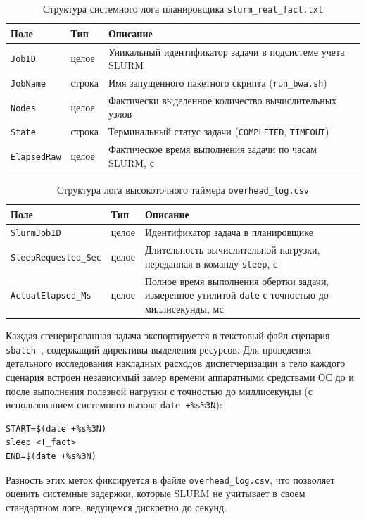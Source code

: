 \begin{table}[H]
\caption{Структура системного лога планировщика \texttt{slurm\_real\_fact.txt}}
\label{tab:csv_fact}
\centering
\small
\begin{tabular}{|l|l|p{8.5cm}|}
\hline
Поле & Тип & Описание \\
\hline
\texttt{JobID}      & целое  & Уникальный идентификатор задачи в подсистеме учета SLURM \\
\texttt{JobName}    & строка & Имя запущенного пакетного скрипта (\texttt{run\_bwa.sh}) \\
\texttt{Nodes}      & целое  & Фактически выделенное количество вычислительных узлов \\
\texttt{State}      & строка & Терминальный статус задачи (\texttt{COMPLETED}, \texttt{TIMEOUT}) \\
\texttt{ElapsedRaw} & целое  & Фактическое время выполнения задачи по часам SLURM, с \\
\hline
\end{tabular}
\end{table}

\begin{table}[H]
\caption{Структура лога высокоточного таймера \texttt{overhead\_log.csv}}
\label{tab:csv_overhead}
\centering
\small
\begin{tabular}{|l|l|p{8.5cm}|}
\hline
Поле & Тип & Описание \\
\hline
\texttt{SlurmJobID}           & целое & Идентификатор задача в планировщике \\
\texttt{SleepRequested\_Sec}  & целое & Длительность вычислительной нагрузки, переданная в команду \texttt{sleep}, с \\
\texttt{ActualElapsed\_Ms}    & целое & Полное время выполнения обертки задачи, измеренное утилитой \texttt{date} с точностью до миллисекунды, мс \\
\hline
\end{tabular}
\end{table}

Каждая сгенерированная задача экспортируется в текстовый файл сценария \texttt{sbatch}~\cite{schedmd2024sbatch}, содержащий директивы выделения ресурсов. Для проведения детального исследования накладных расходов диспетчеризации в тело каждого сценария встроен независимый замер времени аппаратными средствами ОС до и после выполнения полезной нагрузки с точностью до миллисекунды (с использованием системного вызова \texttt{date +\%s\%3N}):
\begin{verbatim}
START=$(date +%s%3N)
sleep <T_fact>
END=$(date +%s%3N)
\end{verbatim}
Разность этих меток фиксируется в файле \texttt{overhead\_log.csv}, что позволяет оценить системные задержки, которые SLURM не учитывает в своем стандартном логе, ведущемся дискретно до секунд.

